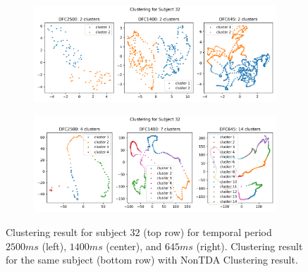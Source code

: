 \begin{figure}[!ht]%
	\centering
	\begin{subfigure}[!ht]{1\textwidth}
		\centering
		\hspace{8mm}
		\includegraphics[width=1\textwidth, trim={0cm, 0.0cm, 0.0cm, 0.0cm}]{figures/clusters/subject_32.png}\hfill
	\end{subfigure}
	\begin{subfigure}[!ht]{1\textwidth}
		\centering
		\hspace{8mm}
		\includegraphics[width=1\textwidth, trim={0cm, 0.0cm, 0.0cm, 0.0cm}]{figures/clusters/subject_32_non_tda.png}\hfill
	\end{subfigure}
	\caption{Clustering result for subject $32$ (top row) for temporal period $2500ms$ (left), $1400ms$ (center), and $645ms$ (right). Clustering result for the same subject (bottom row) with NonTDA Clustering result.}
	\label{fig:clus}
\end{figure}

